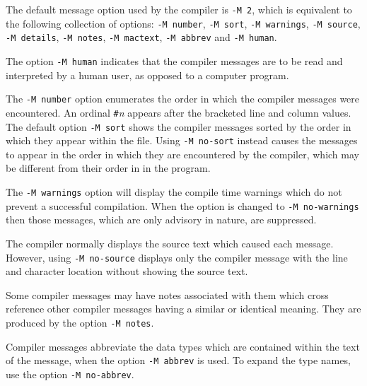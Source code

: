 The default message option used by the \asharp{} compiler is {\tt -M 2},
which is equivalent to the following collection of options:  {\tt -M number},
{\tt -M sort}, {\tt -M warnings}, {\tt -M source}, {\tt -M details},
{\tt -M notes}, {\tt -M mactext}, {\tt -M abbrev} and {\tt -M human}.

The option {\tt -M human} indicates that the compiler 
messages are to be read and interpreted by a human user, as opposed to a 
computer program.

The {\tt -M number} option enumerates the order in which the
compiler messages were encountered.  An ordinal {\tt \#}{\it n} appears
after the bracketed line and column values.  The default option
{\tt -M sort} shows the compiler messages sorted by the order in which
they appear within the file.  Using {\tt -M no-sort} instead causes the
messages to appear in the order in which they are encountered by the
compiler, which may be different from their order in in the program.

The {\tt -M warnings} option will display the compile time
warnings which do not prevent a successful compilation.  When the option
is changed to {\tt -M no-warnings} then those messages, which are only
advisory in nature, are suppressed.

The compiler normally displays the source text which caused each
message.  However, using {\tt -M no-source} displays only the compiler message
with the line and character location without showing the source text.

Some compiler messages may have notes associated with them which cross
reference other compiler messages having a similar or identical meaning.
They are produced by the option {\tt -M notes}.

Compiler messages abbreviate the data types which are contained within
the text of the message, when the option {\tt -M abbrev} is used.
To expand the type names, use the option {\tt -M no-abbrev}.

